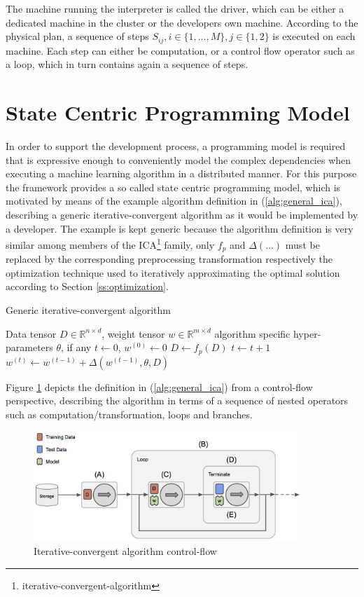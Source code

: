 The machine running the interpreter is called the driver, which can be either a dedicated machine in the cluster or the developers own machine.
According to the physical plan, a sequence of steps $S_{ij}, i \in \{1, \ldots, M\}, j \in \{1, 2\}$ is executed on each machine.
Each step can either be computation, or a control flow operator such as a loop, which in turn contains again a sequence of steps.


\section{State Centric Programming Model}
In order to support the development process, a programming model is required that is expressive enough to conveniently model the complex dependencies when executing a machine learning algorithm in a distributed manner.
For this purpose the framework provides a so called state centric programming model, which is motivated by means of the example algorithm definition in (\ref{alg:general_ica}), describing a generic iterative-convergent algorithm as it would be implemented by a developer.
The example is kept generic because the algorithm definition is very similar among members of the ICA\footnote{iterative-convergent-algorithm} family, only $f_p$ and $\Delta(\ldots)$ must be replaced by the corresponding preprocessing transformation respectively the optimization technique used to iteratively approximating the optimal solution according to Section \ref{ss:optimization}.
\begin{algorithm}
\caption{Generic iterative-convergent algorithm}\label{alg:general_ica}
\begin{algorithmic}[1]{}
\ALGSTATE Data tensor $D \in \mathbb{R}^{n \times d}$, weight tensor $w \in \mathbb{R}^{m \times d}$
\INPUT algorithm specific hyper-parameters $\theta$, if any
\INIT $t \gets 0$, $w^{(0)} \gets 0$
\State $D \gets f_{p}(D)$ 
\Repeat {}
\State $t \gets t + 1$
\State $w^{(t)} \gets w^{(t-1)} + \Delta(w^{(t-1)}, \theta, D)$ 
 
\end{algorithmic}
\end{algorithm}
Figure \ref{fig:ica_control_flow} depicts the definition in (\ref{alg:general_ica}) from a control-flow perspective, describing the algorithm in terms of a sequence of nested operators such as computation/transformation, loops and branches.
\begin{figure}[ht]
\centering
\includegraphics[width=0.9\textwidth]{img/ica_control_flow.png}
\caption{Iterative-convergent algorithm control-flow}
\label{fig:ica_control_flow}
\end{figure}
